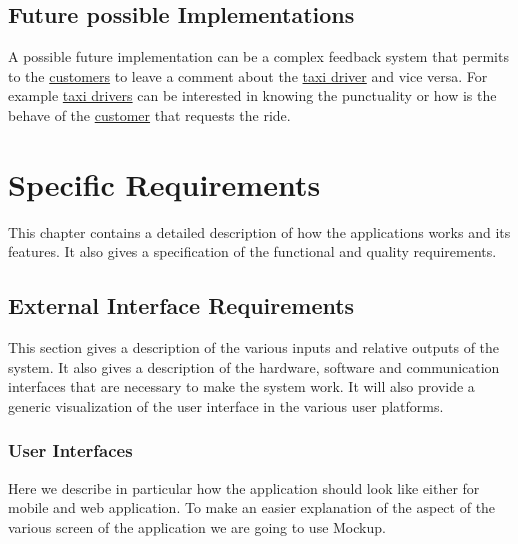 \documentclass{report}
\begin{document}
	\section{Future possible Implementations}
	A possible future implementation can be a complex feedback system that permits to the \hyperref[sec:customer]{customers} to leave a comment about the \hyperref[sec:tdriver]{taxi driver} and vice versa.
	For example \hyperref[sec:tdriver]{taxi drivers} can be interested in knowing the punctuality or how is the behave of the \hyperref[sec:customer]{customer} that requests the ride.

\chapter{Specific Requirements}
This chapter contains a detailed description of how the applications works and its features. It also gives a specification of the functional and quality requirements.

	\section{External Interface Requirements}
	This section gives a description of the various inputs and relative outputs of the system. It also gives a description of the hardware, software and communication interfaces that are necessary to make the system work. It will also provide a generic visualization of the user interface in the various user platforms.

		\subsection{User Interfaces}
		Here we describe in particular how the application should look like either for mobile and web application. To make an easier explanation of the aspect of the various screen of 			the application we are going to use Mockup.
\end{document}
